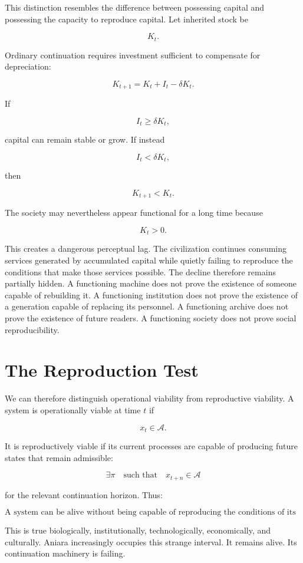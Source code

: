 \documentclass[11pt,oneside]{book}
\theoremstyle{definition}
\theoremstyle{remark}
\newcommand{\A}{\mathcal{A}}
\begin{document}
This distinction resembles the difference between possessing capital and possessing the capacity to
reproduce capital. Let inherited stock be

\[
K_t.
\]

Ordinary continuation requires investment sufficient to compensate for depreciation:

\[
K_{t+1} = K_t + I_t - \delta K_t.
\]

If

\[
I_t \geq \delta K_t,
\]

capital can remain stable or grow. If instead

\[
I_t < \delta K_t,
\]

then

\[
K_{t+1}<K_t.
\]

The society may nevertheless appear functional for a long time because

\[
K_t>0.
\]

This creates a dangerous perceptual lag. The civilization continues consuming services generated by
accumulated capital while quietly failing to reproduce the conditions that make those services
possible. The decline therefore remains partially hidden. A functioning machine does not prove the
existence of someone capable of rebuilding it. A functioning institution does not prove the
existence of a generation capable of replacing its personnel. A functioning archive does not prove
the existence of future readers. A functioning society does not prove social reproducibility.

\section{The Reproduction Test}

We can therefore distinguish operational viability from reproductive viability. A system is
operationally viable at time \(t\) if

\[
x_t\in\A.
\]

It is reproductively viable if its current processes are capable of producing future states that
remain admissible:

\[
\exists \pi \quad \text{such that} \quad x_{t+n}\in\A
\]

for the relevant continuation horizon. Thus:

\[
\boxed{ \text{A system can be alive without being capable of reproducing the conditions of its life.} }
\]

This is true biologically, institutionally, technologically, economically, and culturally. Aniara
increasingly occupies this strange interval. It remains alive. Its continuation machinery is
failing.
\end{document}
